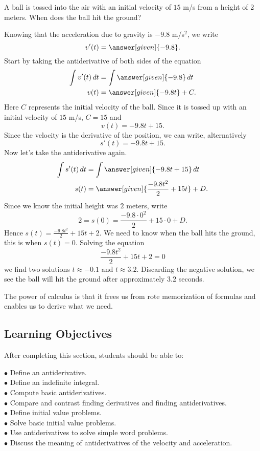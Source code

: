 \documentclass{ximera}
\begin{document}
\begin{example}
A ball is tossed into the air with an initial velocity of $15$ m/s
from a height of 2 meters. When does the ball hit the ground?
\begin{explanation}
Knowing that the acceleration due to gravity is $-9.8$ m/s$^2$, we write
\[
v'(t) = \answer[given]{-9.8}.
\]
Start by taking the antiderivative of both sides of the equation
\begin{align*}
\int v'(t) \d t &= \int \answer[given]{-9.8} \d t\\
v(t) &= \answer[given]{-9.8 t} + C.
\end{align*}
Here $C$ represents the initial velocity of the ball. Since it is
tossed up with an initial velocity of $15$ m/s, $C = 15$ and 
\[
v(t) = -9.8t + 15.
\]
Since the velocity is the derivative of the position, we can write, alternatively
\[
s'(t) = -9.8t + 15.
\]
Now let's take the antiderivative again. 
\begin{align*}
\int s'(t) \d t &= \int \answer[given]{-9.8t +15} \d t\\
s(t) &= \answer[given]{\frac{-9.8t^2}{2} + 15t} + D.
\end{align*}
Since we know the initial height was $2$ meters, write
\[
2 = s(0) =  \frac{-9.8\cdot 0^2}{2} + 15\cdot 0 + D.
\]
Hence $s(t) = \frac{-9.8t^2}{2} + 15t + 2$. We need to know when the
ball hits the ground, this is when $s(t)=0$. Solving the equation
\[
\frac{-9.8t^2}{2} + 15t + 2 = 0
\]
we find two solutions $t\approx -0.1$ and $t\approx 3.2$. Discarding
the negative solution, we see the ball will hit the ground after
approximately $3.2$ seconds.
\end{explanation}
\end{example}

The power of calculus is that it frees us from rote memorization of
formulas and enables us to derive what we need.






\subsection{Learning Objectives}
After completing this section, students should be able to:
\vspace{.05in}

\noindent$\bullet$ Define an antiderivative.
\\$\bullet$ Define an indefinite integral.
\\$\bullet$ Compute basic antiderivatives.
\\$\bullet$ Compare and contrast finding derivatives and finding antiderivatives.
\\$\bullet$ Define initial value problems.
\\$\bullet$ Solve basic initial value problems.
\\$\bullet$ Use antiderivatives to solve simple word problems.
\\$\bullet$ Discuss the meaning of antiderivatives of the velocity and acceleration.
\end{document}
